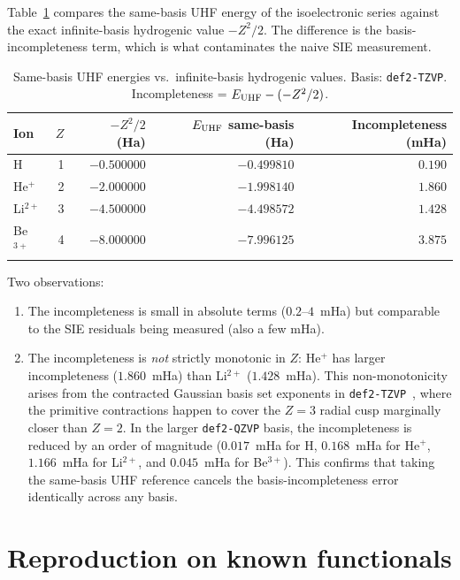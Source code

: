 \documentclass[11pt]{report}
\theoremstyle{definition}
\theoremstyle{remark}
\begin{document}
Table~\ref{tab:basis} compares the same-basis UHF energy of the
isoelectronic series against the exact infinite-basis hydrogenic value
$-Z^2/2$. The difference is the basis-incompleteness term, which is what
contaminates the naive SIE measurement.

\begin{table}[htbp]
\centering
\caption{Same-basis UHF energies vs.\ infinite-basis hydrogenic values.
Basis: \texttt{def2-TZVP}. Incompleteness = $E_{\rm UHF} - (-Z^2/2)$.}
\label{tab:basis}
\begin{tabular}{lrrrr}
\toprule
Ion & $Z$ & $-Z^2/2$ (Ha) & $E_{\rm UHF}$ same-basis (Ha) & Incompleteness (mHa) \\
\midrule
H        & 1 & $-0.500000$ & $-0.499810$ & $0.190$ \\
He$^+$   & 2 & $-2.000000$ & $-1.998140$ & $1.860$ \\
Li$^{2+}$& 3 & $-4.500000$ & $-4.498572$ & $1.428$ \\
Be$^{3+}$& 4 & $-8.000000$ & $-7.996125$ & $3.875$ \\
\bottomrule
\end{tabular}
\end{table}

Two observations:
\begin{enumerate}
  \item The incompleteness is small in absolute terms ($0.2$--$4$~mHa) but
        comparable to the SIE residuals being measured (also a few mHa).
  \item The incompleteness is \emph{not} strictly monotonic in $Z$: He$^+$ has
        larger incompleteness ($1.860$~mHa) than Li$^{2+}$ ($1.428$~mHa).
        This non-monotonicity arises from the contracted Gaussian basis set
        exponents in \texttt{def2-TZVP}~\cite{Weigend2005}, where the primitive
        contractions happen to cover the $Z=3$ radial cusp marginally closer than
        $Z=2$. In the larger \texttt{def2-QZVP} basis, the incompleteness is
        reduced by an order of magnitude ($0.017$~mHa for H, $0.168$~mHa for He$^+$,
        $1.166$~mHa for Li$^{2+}$, and $0.045$~mHa for Be$^{3+}$). This confirms
        that taking the same-basis UHF reference cancels the basis-incompleteness
        error identically across any basis.
\end{enumerate}

\section{Reproduction on known functionals}
\end{document}
